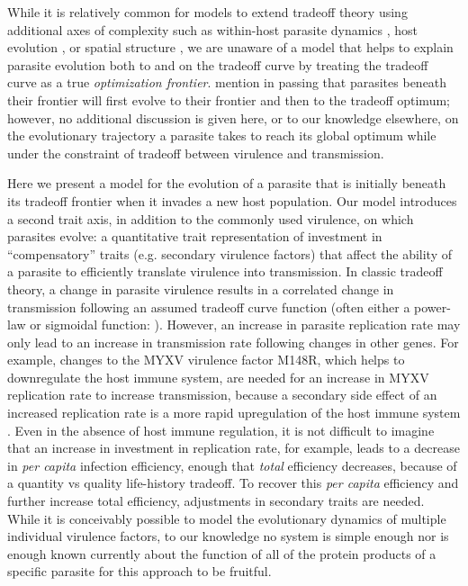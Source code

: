 While it is relatively common for models to extend tradeoff theory using additional axes of complexity such as within-host parasite dynamics \citep{AlizonandvanBaalen2005, Dayetal.2011, Mideoetal.2011}, host evolution \citep{CarvalandFerriere2010, Bestetal.2014, Papkouetal.2016}, or spatial structure \citep{Lipsitchetal.1995, HaraguchiandSasaki2000, LionandGandon2015}, we are unaware of a model that helps to explain parasite evolution both to and on the tradeoff curve by treating the tradeoff curve as a true \emph{optimization frontier}. \citet{Alizonetal.2009} mention in passing that parasites beneath their frontier will first evolve to their frontier and then to the tradeoff optimum; however, no additional discussion is given here, or to our knowledge elsewhere, on the evolutionary trajectory a parasite takes to reach its global optimum while under the constraint of tradeoff between virulence and transmission. 

Here we present a model for the evolution of a parasite that is initially beneath its tradeoff frontier when it invades a new host population. Our model introduces a second trait axis, in addition to the commonly used virulence, on which parasites evolve: a quantitative trait representation of investment in ``compensatory'' traits (e.g. secondary virulence factors) that affect the ability of a parasite to efficiently translate virulence into transmission. In classic tradeoff theory, a change in parasite virulence results in a correlated change in transmission following an assumed tradeoff curve function (often either a power-law or sigmoidal function: \citealt{AlizonandvanBaalen2005, Bolkeretal.2010, Kainetal.2018}). However, an increase in parasite replication rate may only lead to an increase in transmission rate following changes in other genes. For example, changes to the MYXV virulence factor M148R, which helps to downregulate the host immune system, are needed for an increase in MYXV replication rate to increase transmission, because a secondary side effect of an increased replication rate is a more rapid upregulation of the host immune system \citep{Blanieetal.2009}. Even in the absence of host immune regulation, it is not difficult to imagine that an increase in investment in replication rate, for example, leads to a decrease in \emph{per capita} infection efficiency, enough that \emph{total} efficiency decreases, because of a quantity vs quality life-history tradeoff. To recover this \emph{per capita} efficiency and further increase total efficiency, adjustments in secondary traits are needed. While it is conceivably possible to model the evolutionary dynamics of multiple individual virulence factors, to our knowledge no system is simple enough nor is enough known currently about the function of all of the protein products of a specific parasite for this approach to be fruitful. 

